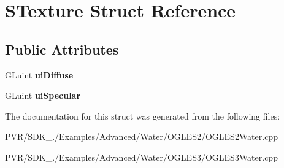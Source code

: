 \hypertarget{struct_s_texture}{\section{S\+Texture Struct Reference}
\label{struct_s_texture}
}
\subsection*{Public Attributes}
\begin{DoxyCompactItemize}
\item 
\hypertarget{struct_s_texture_afbe27f19f757c7d199add5d80f5a3a44}{G\+Luint {\bfseries ui\+Diffuse}}\label{struct_s_texture_afbe27f19f757c7d199add5d80f5a3a44}

\item 
\hypertarget{struct_s_texture_a2edc19cac15caabda7e8b1bea87f1c67}{G\+Luint {\bfseries ui\+Specular}}\label{struct_s_texture_a2edc19cac15caabda7e8b1bea87f1c67}

\end{DoxyCompactItemize}


The documentation for this struct was generated from the following files\+:\begin{DoxyCompactItemize}
\item 
P\+V\+R/\+S\+D\+K\+\_./\+Examples/\+Advanced/\+Water/\+O\+G\+L\+E\+S2/O\+G\+L\+E\+S2\+Water.\+cpp\item 
P\+V\+R/\+S\+D\+K\+\_./\+Examples/\+Advanced/\+Water/\+O\+G\+L\+E\+S3/O\+G\+L\+E\+S3\+Water.\+cpp\end{DoxyCompactItemize}
